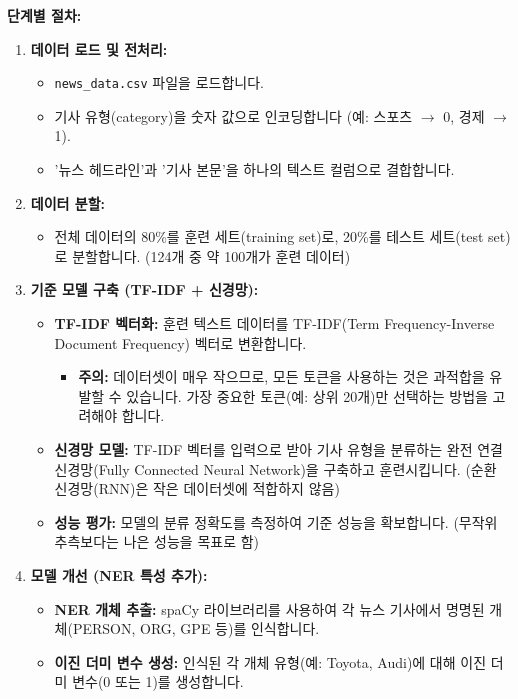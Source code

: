 \documentclass[11pt,a4paper]{article}
\begin{document}
\textbf{단계별 절차:}
\begin{enumerate}
    \item \textbf{데이터 로드 및 전처리:}
        \begin{itemize}
            \item \texttt{news\_data.csv} 파일을 로드합니다.
            \item 기사 유형(category)을 숫자 값으로 인코딩합니다 (예: 스포츠 $\rightarrow$ 0, 경제 $\rightarrow$ 1).
            \item '뉴스 헤드라인'과 '기사 본문'을 하나의 텍스트 컬럼으로 결합합니다.
        \end{itemize}
    \item \textbf{데이터 분할:}
        \begin{itemize}
            \item 전체 데이터의 80\%를 훈련 세트(training set)로, 20\%를 테스트 세트(test set)로 분할합니다. (124개 중 약 100개가 훈련 데이터)
        \end{itemize}
    \item \textbf{기준 모델 구축 (TF-IDF + 신경망):}
        \begin{itemize}
            \item \textbf{TF-IDF 벡터화:} 훈련 텍스트 데이터를 TF-IDF(Term Frequency-Inverse Document Frequency) 벡터로 변환합니다.
                \begin{itemize}
                    \item \textbf{주의:} 데이터셋이 매우 작으므로, 모든 토큰을 사용하는 것은 과적합을 유발할 수 있습니다. 가장 중요한 토큰(예: 상위 20개)만 선택하는 방법을 고려해야 합니다.
                \end{itemize}
            \item \textbf{신경망 모델:} TF-IDF 벡터를 입력으로 받아 기사 유형을 분류하는 완전 연결 신경망(Fully Connected Neural Network)을 구축하고 훈련시킵니다. (순환 신경망(RNN)은 작은 데이터셋에 적합하지 않음)
            \item \textbf{성능 평가:} 모델의 분류 정확도를 측정하여 기준 성능을 확보합니다. (무작위 추측보다는 나은 성능을 목표로 함)
        \end{itemize}
    \item \textbf{모델 개선 (NER 특성 추가):}
        \begin{itemize}
            \item \textbf{NER 개체 추출:} spaCy 라이브러리를 사용하여 각 뉴스 기사에서 명명된 개체(PERSON, ORG, GPE 등)를 인식합니다.
            \item \textbf{이진 더미 변수 생성:} 인식된 각 개체 유형(예: Toyota, Audi)에 대해 이진 더미 변수(0 또는 1)를 생성합니다.

\end{itemize}
\end{enumerate}
\end{document}
